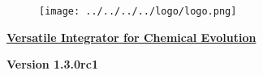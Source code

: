 
\begin{center}
\begin{figure}[!h]
\centering
\texttt{[image: ../../../../logo/logo.png]}
\end{figure}
\underline{\LARGE \textbf{Versatile Integrator for Chemical Evolution}}
\par
{\Large \textbf{Version 1.3.0rc1}}
\end{center}
